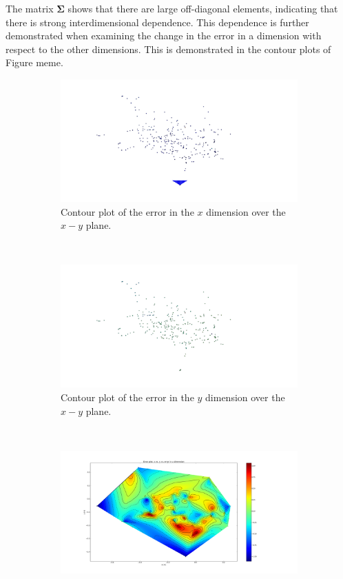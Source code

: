The matrix $\bm{\Sigma}$ shows that there are large off-diagonal elements, indicating that there is strong interdimensional dependence. This dependence is further demonstrated when examining the change in the error in a dimension with respect to the other dimensions. This is demonstrated in the contour plots of Figure meme. 

\begin{figure}
  \centering
  \begin{subfigure}{0.31\textwidth}
    \includegraphics[clip, trim = 200 50 300 50, width=\textwidth]{figures/chapter3/contour_x}
    \caption{Contour plot of the error in the $x$ dimension over the $x-y$ plane.}
  \end{subfigure}
~
  \begin{subfigure}{0.31\textwidth}
    \includegraphics[clip, trim = 200 50 300 50, width=\textwidth]{figures/chapter3/contour_y}
    \caption{Contour plot of the error in the $y$ dimension over the $x-y$ plane.}
  \end{subfigure}
~
  \begin{subfigure}{0.31\textwidth}
    \includegraphics[clip, trim = 200 50 300 50, width=\textwidth]{figures/chapter3/contour_z}

\end{subfigure}
\end{figure}

